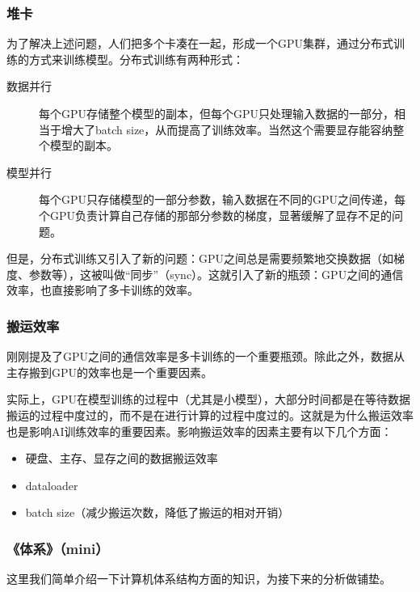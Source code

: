 \documentclass{ctexbeamer}
\begin{document}
\begin{frame}
    \frametitle{堆卡}

    为了解决上述问题，人们把多个卡凑在一起，形成一个GPU集群，通过分布式训练的方式来训练模型。分布式训练有两种形式：
    \begin{description}
        \item[数据并行] 每个GPU存储整个模型的副本，但每个GPU只处理输入数据的一部分，相当于增大了batch size，从而提高了训练效率。当然这个需要显存能容纳整个模型的副本。
        \item[模型并行] 每个GPU只存储模型的一部分参数，输入数据在不同的GPU之间传递，每个GPU负责计算自己存储的那部分参数的梯度，显著缓解了显存不足的问题。
    \end{description}

    但是，分布式训练又引入了新的问题：GPU之间总是需要频繁地交换数据（如梯度、参数等），这被叫做“同步”（sync）。这就引入了新的瓶颈：GPU之间的通信效率，也直接影响了多卡训练的效率。

\end{frame}

\begin{frame}
    \frametitle{搬运效率}

    刚刚提及了GPU之间的通信效率是多卡训练的一个重要瓶颈。除此之外，数据从主存搬到GPU的效率也是一个重要因素。

    实际上，GPU在模型训练的过程中（尤其是小模型），大部分时间都是在等待数据搬运的过程中度过的，而不是在进行计算的过程中度过的。这就是为什么搬运效率也是影响AI训练效率的重要因素。影响搬运效率的因素主要有以下几个方面：
    \begin{itemize}
        \item 硬盘、主存、显存之间的数据搬运效率
        \item dataloader
        \item batch size（减少搬运次数，降低了搬运的相对开销）
    \end{itemize}

\end{frame}

\begin{frame}
    \frametitle{《体系》（mini）}

    这里我们简单介绍一下计算机体系结构方面的知识，为接下来的分析做铺垫。

    \begin{figure}
        \centering
        
    \end{figure}

\end{frame}
\end{document}
